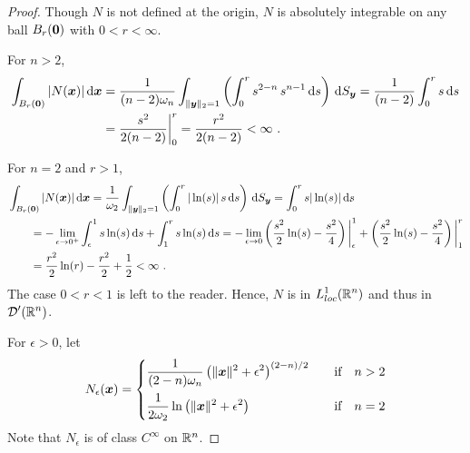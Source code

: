 \begin{proof}
Though $N$ is not defined at the origin, $N$ is absolutely integrable
on any ball $B_r({\bm{0}})$ with $0<r<\infty$.

For $n>2$,
\begin{align*}
\int_{B_r({\bm{0}})} |N({\bm{x}})| \,\mathrm{d}{{\bm{x}}}
&= \frac{1}{(n-2)\omega_n}
\int_{\|{\bm{y}}\|_2 =1} \left( \int_0^r s^{2-n} \, s^{n-1} \,\mathrm{d}{s} \right)
\,\mathrm{d}{S}_{{\bm{y}}}
= \frac{1}{(n-2)} \int_0^r s \,\mathrm{d}{s} \\
&= \frac{s^2}{2(n-2)}\bigg|_0^r = \frac{r^2}{2(n-2)} < \infty \ .
\end{align*}

For $n=2$ and $r>1$,
\begin{align*}
&\int_{B_r({\bm{0}})} |N({\bm{x}})| \,\mathrm{d}{{\bm{x}}}
= \frac{1}{\omega_2}
\int_{\|{\bm{y}}\|_2 =1} \left( \int_0^r |\ln(s)| \, s \,\mathrm{d}{s} \right) \,\mathrm{d}{S}_{{\bm{y}}}
= \int_0^r s |\ln(s)| \,\mathrm{d}{s} \\
&\qquad = -\lim_{\epsilon \to 0^+} \int_\epsilon^1 s\ln(s) \,\mathrm{d}{s}  
+ \int_1^r s\ln(s) \,\mathrm{d}{s}  
= -\lim_{\epsilon \to 0} \left( \frac{s^2}{2}\ln(s) - \frac{s^2}{4}
\right)\bigg|_\epsilon^1
+ \left( \frac{s^2}{2}\ln(s) - \frac{s^2}{4} \right)\bigg|_1^r \\
&\qquad = \frac{r^2}{2}\ln(r) - \frac{r^2}{2} + \frac{1}{2} < \infty \ .
\end{align*}
The case $0<r<1$ is left to the reader.
Hence, $N$ is in $\displaystyle L^1_{loc}(\mathbb{R}^n)$ and thus in
$\displaystyle \mathcal{D}'(\mathbb{R}^n)$.

For $\epsilon >0$, let
\[
N_\epsilon({\bm{x}}) =
\begin{cases}
\displaystyle \frac{1}{(2-n)\omega_n}
\left( \|{\bm{x}}\|^2 + \epsilon^2\right)^{(2-n)/2} & \quad 
\text{if} \quad n>2 \\[1em]
\displaystyle \frac{1}{2\omega_2}
\ln\left(\|{\bm{x}}\|^2 + \epsilon^2 \right) & \quad 
\text{if} \quad n=2
\end{cases}
\]
Note that $N_\epsilon$ is of class $C^{\infty}$ on $\mathbb{R}^n$.


\end{proof}
